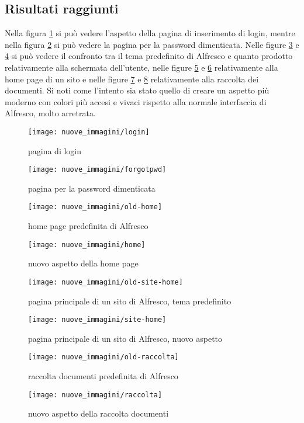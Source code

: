 \subsection{Risultati raggiunti}
Nella figura \ref{fig:login} si può vedere l'aspetto della pagina di inserimento di login, mentre nella figura \ref{fig:forgotpwd} si può vedere la pagina per la password dimenticata. Nelle figure \ref{fig:old-home} e \ref{fig:home} si può vedere il confronto tra il tema predefinito di Alfresco e quanto prodotto relativamente alla schermata dell'utente, nelle figure \ref{fig:old-site-home} e \ref{fig:site-home} relativamente alla home page di un sito e nelle figure \ref{fig:old-raccolta} e \ref{fig:raccolta} relativamente alla raccolta dei documenti. Si noti come l'intento sia stato quello di creare un aspetto più moderno con colori più accesi e vivaci rispetto alla normale interfaccia di Alfresco, molto arretrata.
\begin{figure}[!ht]
\centering
\texttt{[image: nuove\_immagini/login]}
\caption{pagina di login\label{fig:login}}
\end{figure}
\begin{figure}[!ht]
\centering
\texttt{[image: nuove\_immagini/forgotpwd]}
\caption{pagina per la password dimenticata\label{fig:forgotpwd}}
\end{figure}
\begin{figure}[!ht]
\centering
\texttt{[image: nuove\_immagini/old-home]}
\caption{home page predefinita di Alfresco \label{fig:old-home}}
\end{figure}
\begin{figure}[!ht]
\centering
\texttt{[image: nuove\_immagini/home]}
\caption{nuovo aspetto della home page \label{fig:home}}
\end{figure}
\begin{figure}[!ht]
\centering
\texttt{[image: nuove\_immagini/old-site-home]}
\caption{pagina principale di un sito di Alfresco, tema predefinito \label{fig:old-site-home}}
\end{figure}
\begin{figure}[!ht]
\centering
\texttt{[image: nuove\_immagini/site-home]}
\caption{pagina principale di un sito di Alfresco, nuovo aspetto \label{fig:site-home}}
\end{figure}
\begin{figure}[!ht]
\centering
\texttt{[image: nuove\_immagini/old-raccolta]}
\caption{raccolta documenti predefinita di Alfresco \label{fig:old-raccolta}}
\end{figure}
\begin{figure}[!ht]
\centering
\texttt{[image: nuove\_immagini/raccolta]}
\caption{nuovo aspetto della raccolta documenti \label{fig:raccolta}}
\end{figure}